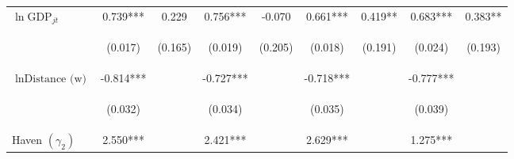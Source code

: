 \begin{center}
\begin{tabular}{lcccccccc}
$\ln\text{GDP}_{jt}$ & 0.739*** & 0.229 & 0.756*** & -0.070 & 0.661*** & 0.419** & 0.683*** & 0.383** \\
\vspace{4pt} & \begin{footnotesize}(0.017)\end{footnotesize} & \begin{footnotesize}(0.165)\end{footnotesize} & \begin{footnotesize}(0.019)\end{footnotesize} & \begin{footnotesize}(0.205)\end{footnotesize} & \begin{footnotesize}(0.018)\end{footnotesize} & \begin{footnotesize}(0.191)\end{footnotesize} & \begin{footnotesize}(0.024)\end{footnotesize} & \begin{footnotesize}(0.193)\end{footnotesize} \\
$\ln\text{Distance (w)}$ & -0.814*** &  & -0.727*** &  & -0.718*** &  & -0.777*** &  \\
\vspace{4pt} & \begin{footnotesize}(0.032)\end{footnotesize} & \begin{footnotesize}\end{footnotesize} & \begin{footnotesize}(0.034)\end{footnotesize} & \begin{footnotesize}\end{footnotesize} & \begin{footnotesize}(0.035)\end{footnotesize} & \begin{footnotesize}\end{footnotesize} & \begin{footnotesize}(0.039)\end{footnotesize} & \begin{footnotesize}\end{footnotesize} \\
Haven $(\gamma_2)$ & 2.550*** &  & 2.421*** &  & 2.629*** &  & 1.275*** &  \\

\end{tabular}
\end{center}
